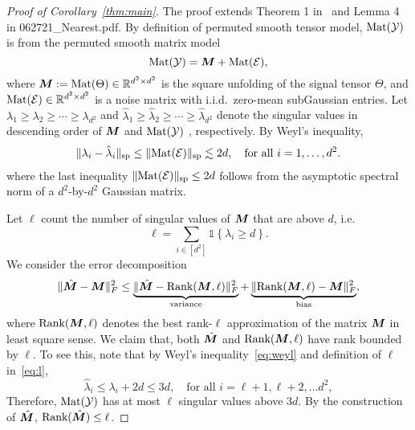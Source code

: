 \documentclass[10pt]{article}
\newcommand*{\KeepStyleUnderBrace}[1]{%
  \mathop{%
    \mathchoice
    {\underbrace{\displaystyle#1}}%
    {\underbrace{\textstyle#1}}%
    {\underbrace{\scriptstyle#1}}%
    {\underbrace{\scriptscriptstyle#1}}%
  }\limits
}
\theoremstyle{definition}
\theoremstyle{definition}
\def\rank{\text{Rank}}
\def\Mat{\text{Mat}}
\theoremstyle{definition}
\begin{document}
\begin{proof}[Proof of Corollary~\ref{thm:main}] The proof extends Theorem 1 in~\cite{xu2018rates} and Lemma 4 in 062721\_Nearest.pdf.  By definition of permuted smooth tensor model, $\text{Mat}(\mathcal{Y})$ is from the permuted smooth matrix model
\[
\Mat(\tY)=\mM+\Mat(\tE),
\]
where $\bm M:=\text{Mat}(\Theta)\in\mathbb{R}^{d^2\times d^2}$ is the square unfolding of the signal tensor $\Theta$, and $\text{Mat}(\mathcal{E})\in\mathbb{R}^{d^2\times d^2}$ is a noise matrix with i.i.d.\ zero-mean subGaussian entries. Let $\lambda_1\geq \lambda_2\geq \cdots \geq \lambda_{d^2}$ and $\hat \lambda_1\geq \hat \lambda_2\geq \cdots \geq \hat  \lambda_{d^2}$ denote the singular values in descending order of $\bm M$ and $\text{Mat}(\mathcal{Y})$ , respectively. By Weyl's inequality, 
\begin{align}\label{eq:weyl}
\snormSize{}{\lambda_i-\hat \lambda_i}\leq \snormSize{}{\Mat(\tE)}\lesssim 2d, \quad \text{for all }i=1,\ldots,d^2. 
\end{align}
where the last inequality $\snormSize{}{\Mat(\tE)}\leq 2d$ follows from the asymptotic spectral norm of a $d^2$-by-$d^2$ Gaussian matrix. 

Let $\ell$ count the number of singular values of $\bm M$ that are above $d$, i.e.
\begin{equation}\label{eq:l}
\ell=\sum_{i\in[d^2]}\mathds{1}\left\{ \lambda_i\geq d \right\}.
\end{equation}
We consider the error decomposition
\begin{equation}\label{eq:two}
\FnormSize{}{\hat \mM-\mM}^2  \leq \KeepStyleUnderBrace{\FnormSize{}{\hat \mM-\rank(\mM, \ell)}^2}_{\text{variance}}+\KeepStyleUnderBrace{\FnormSize{}{\rank(\mM, \ell)-\mM}^2}_{\text{bias}},
\end{equation}
where $\rank(\mM, \ell)$ denotes the best rank-$\ell$ approximation of the matrix $\bm M$ in least square sense. We claim that, both $\hat {\bm M}$ and $\rank(\mM,\ell)$ have rank bounded by $\ell$. To see this, note that by Weyl's inequality~\eqref{eq:weyl} and definition of $\ell$ in~\eqref{eq:l},
\[
\hat \lambda_i  \leq \lambda_i+2d \leq 3d, \quad \text{for all }i=\ell+1,\ell+2,\ldots d^2, 
\]
Therefore, $\text{Mat}(\mathcal{Y})$ has at most $\ell$ singular values above $3d$. By the construction of $\hat {\bm M}$, $\rank(\hat \mM)\leq \ell$. 


\end{proof}
\end{document}
